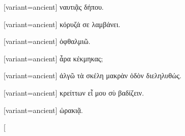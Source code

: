 \switchcolumn

\begin{greek}[variant=ancient]%
ναυτιᾷς δήπου.

\end{greek}%
\switchcolumn*

%
%

\switchcolumn

\begin{greek}[variant=ancient]%
κόρυζά σε λαμβάνει.

\end{greek}%
\switchcolumn*

%
%

\switchcolumn

\begin{greek}[variant=ancient]%
ὀφθαλμιῶ.

\end{greek}%
\switchcolumn*

%
%

\switchcolumn

\begin{greek}[variant=ancient]%
ἆρα κέκμηκας;

\end{greek}%
\switchcolumn*

%
%

\switchcolumn

\begin{greek}[variant=ancient]%
ἀλγῶ τὰ σκέλη μακρὰν ὁδὸν διεληλυθώς.

\end{greek}%
\switchcolumn*

%
%

\switchcolumn

\begin{greek}[variant=ancient]%
κρείττων εἶ μου σὺ βαδίζειν.

\end{greek}%
\switchcolumn*

%

\switchcolumn

\begin{greek}[variant=ancient]%
ὡρακιᾷ.

\end{greek}%
\switchcolumn*[


